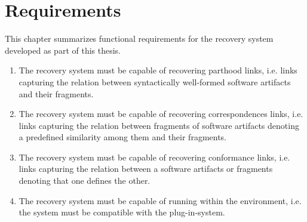 \chapter{Requirements}
This chapter summarizes functional requirements for the recovery system developed as part of this thesis.

\begin{enumerate}[label=\textbf{R\arabic*},ref=R\arabic*]

\item
\label{Requirement:Parthood-Links}
The recovery system must be capable of recovering parthood links, i.e. links capturing the relation between syntactically well-formed software artifacts and their fragments.

\item
\label{Requirement:Correspondence-Links}
The recovery system must be capable of recovering correspondences links, i.e. links capturing the relation between fragments of software artifacts denoting a predefined similarity among them and their fragments.


\item
\label{Requirement:Conformance-Links} 
The recovery system must be capable of recovering conformance links, i.e. links capturing the relation between a software artifacts or fragments denoting that one defines the other.


\item 
\label{Requirement:Megal-Xtext}
The recovery system must be capable of running within the \megalxtext environment, i.e. the system must be compatible with the \megalxtext plug-in-system.

\end{enumerate}
